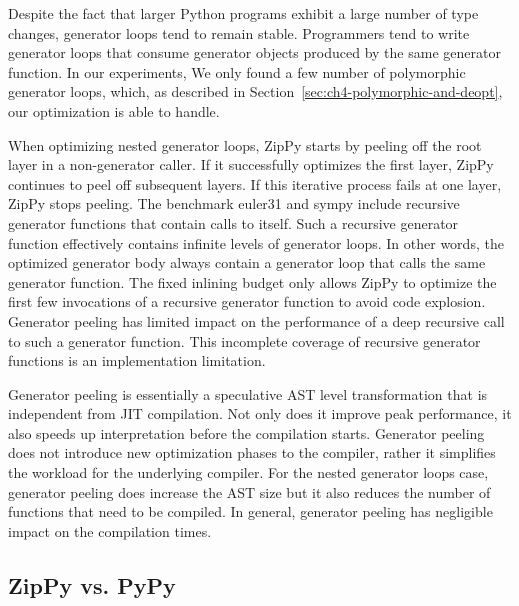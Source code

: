 Despite the fact that larger Python programs exhibit a large number of type changes, generator loops tend to remain stable.
Programmers tend to write generator loops that consume generator objects produced by the same generator function.
In our experiments, We only found a few number of polymorphic generator loops, which, as described in Section~\ref{sec:ch4-polymorphic-and-deopt}, our optimization is able to handle.

When optimizing nested generator loops, ZipPy starts by peeling off the root layer in a non-generator caller.
If it successfully optimizes the first layer, ZipPy continues to peel off subsequent layers.
If this iterative process fails at one layer, ZipPy stops peeling.
The benchmark \textsf{euler31} and \textsf{sympy} include recursive generator functions that contain calls to itself.
Such a recursive generator function effectively contains infinite levels of generator loops.
In other words, the optimized generator body always contain a generator loop that calls the same generator function.
The fixed inlining budget only allows ZipPy to optimize the first few invocations of a recursive generator function to avoid code explosion.
Generator peeling has limited impact on the performance of a deep recursive call to such a generator function.
This incomplete coverage of recursive generator functions is an implementation limitation.

Generator peeling is essentially a speculative AST level transformation that is independent from JIT compilation.
Not only does it improve peak performance, it also speeds up interpretation before the compilation starts.
Generator peeling does not introduce new optimization phases to the compiler, rather it simplifies the workload for the underlying compiler.
For the nested generator loops case, generator peeling does increase the AST size but it also reduces the number of functions that need to be compiled.
In general, generator peeling has negligible impact on the compilation times.

\subsection{ZipPy vs. PyPy}

